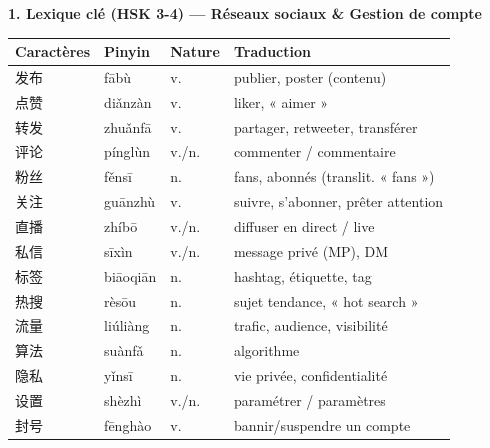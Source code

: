 \documentclass[11pt]{article}
\begin{document}
\begin{bilan}

\textbf{1. Lexique clé (HSK 3-4) — Réseaux sociaux \& Gestion de compte}\par
\begin{center}
\begin{tabularx}{\linewidth}{|X|X|X|X|}
\hline
\rowcolor{popblueL} \textbf{Caractères} & \textbf{Pinyin} & \textbf{Nature} & \textbf{Traduction} \\
\hline
发布 & fābù & v. & publier, poster (contenu) \\
\hline
点赞 & diǎnzàn & v. & liker, « aimer » \\
\hline
转发 & zhuǎnfā & v. & partager, retweeter, transférer \\
\hline
评论 & pínglùn & v./n. & commenter / commentaire \\
\hline
粉丝 & fěnsī & n. & fans, abonnés (translit. « fans ») \\
\hline
关注 & guānzhù & v. & suivre, s'abonner, prêter attention \\
\hline
直播 & zhíbō & v./n. & diffuser en direct / live \\
\hline
私信 & sīxìn & v./n. & message privé (MP), DM \\
\hline
标签 & biāoqiān & n. & hashtag, étiquette, tag \\
\hline
热搜 & rèsōu & n. & sujet tendance, « hot search » \\
\hline
流量 & liúliàng & n. & trafic, audience, visibilité \\
\hline
算法 & suànfǎ & n. & algorithme \\
\hline
隐私 & yǐnsī & n. & vie privée, confidentialité \\
\hline
设置 & shèzhì & v./n. & paramétrer / paramètres \\
\hline
封号 & fēnghào & v. & bannir/suspendre un compte \\
\hline
\end{tabularx}
\end{center}


\end{bilan}
\end{document}
